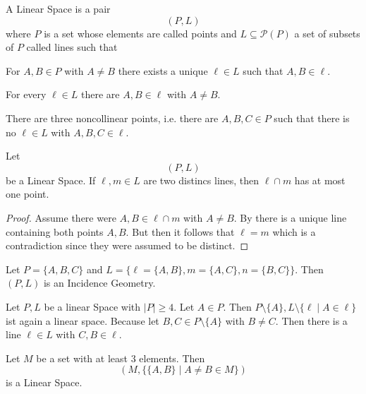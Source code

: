 \begin{Def}
A Linear Space is a pair
\[(P,L)\] 
where \(P\) is a set whose elements are called points 
 and \(L\subseteq \mathcal{P}(P)\) a set of subsets of \(P\) called lines such that 
 \begin{Axiom}[I1]
    For \(A,B\in P\) with \(A\neq B\) there exists a unique 
    \(\ell\in L\) such that \(A,B\in \ell\).\label{Axiom:I1} 
    \end{Axiom} 
\begin{Axiom}[I2]For every \(\ell\in L\) there are \(A,B\in \ell\) with \(A\neq B\).
\end{Axiom}
\begin{Axiom}[I3] There are three noncollinear points, i.e. there are 
    \(A,B,C\in P\) such that there is no \(\ell\in L\) with \(A,B,C\in\ell\).
 \end{Axiom}
\end{Def}
\begin{Satz}
Let \[(P,L)\] be a Linear Space. 
If \(\ell,m\in L\) are two distincs lines, then \(\ell\cap m\) has at most one point.
\end{Satz}
\begin{proof} 
Assume there were \(A,B\in \ell\cap m\) with \(A\neq B\).
By  there is a unique line containing both points \(A,B\). 
But then it follows that \(\ell=m\) which is a contradiction since they were assumed to be distinct.
\end{proof}
\begin{Bsp}
Let \(P=\{A,B,C\}\) and \(L=\{\ell=\{A,B\},m=\{A,C\},n=\{B,C\}\}\). Then 
\((P,L)\) is an Incidence Geometry.
\begin{figure}[H]
    \centering
{}
\end{figure}
\end{Bsp} 

\begin{Bsp}
    Let \(P,L\) be a linear Space with \(|P|\geq 4\). Let \(A\in P\).
    Then \(P\setminus\{A\},L\setminus\{\ell\mid A\in \ell\}\) ist again a linear space.
    Because let \(B,C\in P\setminus\{A\}\) with \(B\neq C\).
    Then there is a line \(\ell\in L\) with \(C,B\in \ell\). 
\end{Bsp}
\begin{Bsp}
    Let \(M\) be a set with at least \(3\) elements. Then 
    \[(M,\{\{A,B\}\mid A\neq B\in M\})\] is a Linear Space.
\end{Bsp}

